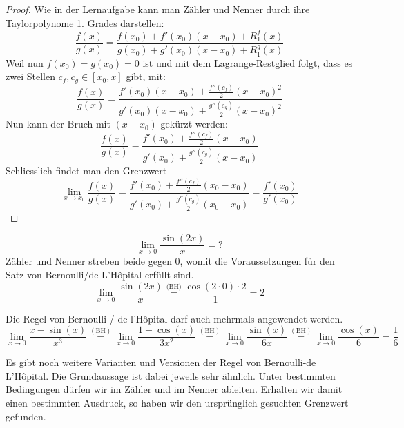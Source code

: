 \begin{proof}
	Wie in der Lernaufgabe kann man Zähler und Nenner durch ihre Taylorpolynome 1. Grades darstellen:
	$$\frac{f(x)}{g(x)} = \frac{f(x_0) + f'(x_0)(x-x_0) + R^f_1(x)}{g(x_0) + g'(x_0)(x-x_0) + R^g_1(x)}$$
	Weil nun $f(x_0) = g(x_0) = 0$ ist und mit dem Lagrange-Restglied folgt, dass es zwei Stellen $c_f, c_g \in [x_0, x]$ gibt, mit:
	$$\frac{f(x)}{g(x)} = \frac{f'(x_0)(x-x_0) + \frac{f''(c_f)}{2} (x-x_0)^2}{ g'(x_0)(x-x_0) + \frac{g''(c_g)}{2}(x-x_0)^2}$$
	Nun kann der Bruch mit $(x-x_0)$ gekürzt werden:
	$$\frac{f(x)}{g(x)} = \frac{f'(x_0) + \frac{f''(c_f)}{2} (x-x_0)}{ g'(x_0) + \frac{g''(c_g)}{2}(x-x_0)}$$
	Schliesslich findet man den Grenzwert
	$$\lim_{{x \to x_0}} \frac{f(x)}{g(x)} = \frac{f'(x_0) + \frac{f''(c_f)}{2} (x_0-x_0)}{ g'(x_0) + \frac{g''(c_g)}{2}(x_0-x_0)} = \frac{f'(x_0)}{g'(x_0)}$$


\end{proof}

\begin{bsp}
	{}{}
	$$\lim_{x\rightarrow0} \frac{\sin(2x)}{x} = ? $$
	Zähler und Nenner streben beide gegen $0$, womit die Voraussetzungen für den Satz von Bernoulli/de L’Hôpital erfüllt sind.
	$$\lim_{x\rightarrow0} \frac{\sin(2x)}{x} \stackrel{\text{(BH)}}{=}  \frac{\cos(2 \cdot 0)\cdot 2}{1} = 2 $$
\end{bsp}
\begin{bsp}
	{}{}
	Die Regel von Bernoulli / de l’Hôpital darf auch mehrmals angewendet werden.
	\[
		\lim_{{x \to 0}} \frac{{x - \sin(x)}}{{x^3}} \overset{(\text{BH})}{=}
		\lim_{{x \to 0}} \frac{{1 - \cos(x)}}{{3x^2}} \overset{(\text{BH})}{=}
		\lim_{{x \to 0}} \frac{{\sin(x)}}{{6x}} \overset{(\text{BH})}{=}
		\lim_{{x \to 0}} \frac{{\cos(x)}}{{6}} = \frac{1}{6}
	\]

\end{bsp}

Es gibt noch weitere Varianten und Versionen der Regel von Bernoulli-de L'Hôpital. Die Grundaussage ist dabei jeweils sehr ähnlich. Unter bestimmten Bedingungen dürfen wir im Zähler und im Nenner ableiten. Erhalten wir damit einen bestimmten Ausdruck, so haben wir den ursprünglich gesuchten Grenzwert gefunden.

